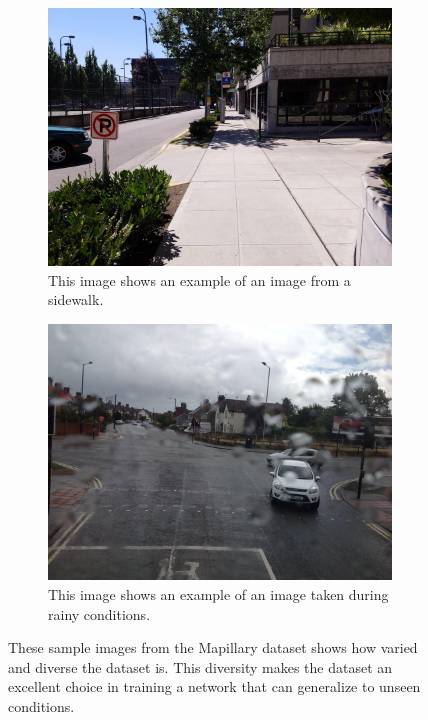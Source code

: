 \begin{figure}[]
	\vspace{12pt}%
	
	\begin{subfigure}{.45\textwidth}
		\centering
		\includegraphics[width=\linewidth]{figures/experiments/dataset/3.jpg}
		\caption[Dataset Sample 3]{This image shows an example of an image from a sidewalk.}
		\label{fig:dataset-3}
	\end{subfigure}
	\hfill
	\begin{subfigure}{.45\textwidth}
		\centering
		\includegraphics[width=\linewidth]{figures/experiments/dataset/4.jpg}
		\caption[Dataset Sample 4]{This image shows an example of an image taken during rainy conditions.}
		\label{fig:dataset-4}
	\end{subfigure}

	\caption[Mapillary Vistas Dataset Sample Images]{These sample images from the Mapillary dataset shows how varied and diverse the dataset is. This diversity makes the dataset an excellent choice in training a network that can generalize to unseen conditions.}
	\label{fig:experiments-datasetsamples}
\end{figure}